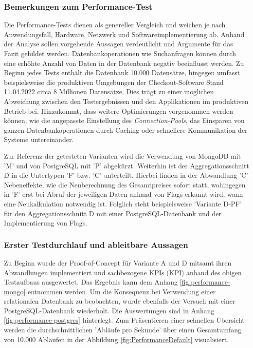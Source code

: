 \subsubsection{Bemerkungen zum Performance-Test}

Die Performance-Tests dienen als genereller Vergleich und weichen je nach Anwendungsfall, Hardware, Netzwerk und Softwareimplementierung ab. Anhand der Analyse sollen vorgehende Aussagen verdeutlicht und Argumente für das Fazit gebildet werden. Datenbankoperationen wie Suchanfragen können durch eine erhöhte Anzahl von Daten in der Datenbank negativ beeinflusst werden. Zu Beginn jedes Tests enthält die Datenbank 10.000 Datensätze, hingegen umfasst beispielsweise die produktiven Umgebungen der Checkout-Software Stand 11.04.2022 circa 8 Millionen Datensätze. Dies trägt zu einer möglichen Abweichung zwischen den Testergebnissen und den Applikationen im produktiven Betrieb bei. Hinzukommt, dass weitere Optimierungen vorgenommen werden können, wie die angepasste Einstellung des \emph{\Gls{Connection-Pool}s}, das Einsparen von ganzen Datenbankoperationen durch Caching oder schnellere Kommunikation der Systeme untereinander. 

Zur Referenz der getesteten Varianten wird die Verwendung von MongoDB mit 'M' und von PostgreSQL mit 'P' abgekürzt. Weiterhin ist der Aggregationsschnitt D in die Untertypen 'F' bzw. 'C' unterteilt. Hierbei finden in der Abwandlung 'C' Nebeneffekte, wie die Neuberechnung des Gesamtpreises sofort statt, wohingegen in 'F' erst bei Abruf der jeweiligen Daten anhand von Flags erkannt wird, wann eine Neukalkulation notwendig ist. Folglich steht beispielsweise 'Variante D-PF' für den Aggregationsschnitt D mit einer PostgreSQL-Datenbank und der Implementierung von Flags.

\pagebreak

\subsubsection{Erster Testdurchlauf und ableitbare Aussagen}

Zu Beginn wurde der Proof-of-Concept für Variante A und D mitsamt ihren Abwandlungen implementiert und sachbezogene \acrshort{KPI}s (\acrlong{KPI}) anhand des obigen Testaufbaus ausgewertet. Das Ergebnis kann dem Anhang \ref{fig:performance-mongo} entnommen werden. Um die Konsequenz bei Verwendung einer relationalen Datenbank zu beobachten, wurde ebenfalls der Versuch mit einer PostgreSQL-Datenbank wiederholt. Die Auswertungen sind in Anhang \ref{fig:performance-postgres} hinterlegt. Zum Präsentieren einer schnellen Übersicht werden die durchschnittlichen 'Abläufe pro Sekunde' über einen Gesamtumfang von 10.000 Abläufen in der Abbildung \ref{fig:PerformanceDefault} visualisiert.

